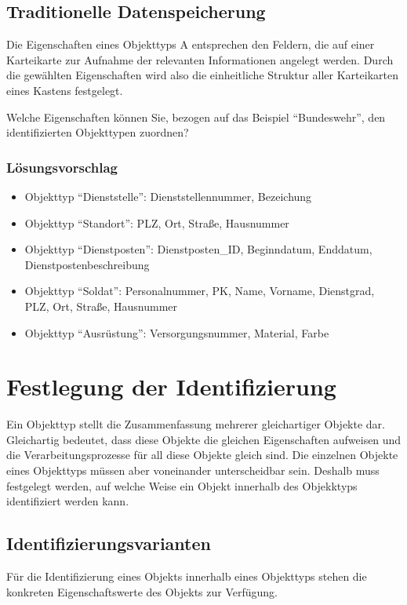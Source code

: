       \subsection{Traditionelle Datenspeicherung}
        Die Eigenschaften eines Objekttyps A entsprechen den Feldern, die auf
        einer Karteikarte zur Aufnahme der relevanten Informationen angelegt
        werden. Durch die gewählten Eigenschaften wird also die einheitliche
        Struktur aller Karteikarten eines Kastens festgelegt.

        Welche Eigenschaften können Sie, bezogen auf das Beispiel
        \enquote{Bundeswehr}, den identifizierten Objekttypen zuordnen?
        \subsubsection{Lösungsvorschlag}
          \begin{itemize}
            \item Objekttyp \enquote{Dienststelle}: Dienststellennummer,
            Bezeichung
            \item Objekttyp \enquote{Standort}: PLZ, Ort, Straße, Hausnummer
            \item Objekttyp \enquote{Dienstposten}: Dienstposten\_ID,
            Beginndatum, Enddatum, Dienstpostenbeschreibung
            \item Objekttyp \enquote{Soldat}: Personalnummer, PK, Name, Vorname,
            Dienstgrad, PLZ, Ort, Straße, Hausnummer
            \item Objekttyp \enquote{Ausrüstung}: Versorgungsnummer, Material,
            Farbe
          \end{itemize}
    \section{Festlegung der Identifizierung}
      Ein Objekttyp stellt die Zusammenfassung mehrerer gleichartiger Objekte
      dar. Gleichartig bedeutet, dass diese Objekte die gleichen Eigenschaften
      aufweisen und die Verarbeitungsprozesse für all diese Objekte gleich
      sind. Die einzelnen Objekte eines Objekttyps müssen aber voneinander
      unterscheidbar sein. Deshalb muss festgelegt werden, auf welche Weise ein
      Objekt innerhalb des Objekktyps identifiziert werden kann.

      \subsection{Identifizierungsvarianten}
        Für die Identifizierung eines Objekts innerhalb eines Objekttyps
        stehen die konkreten Eigenschaftswerte des Objekts zur Verfügung.

